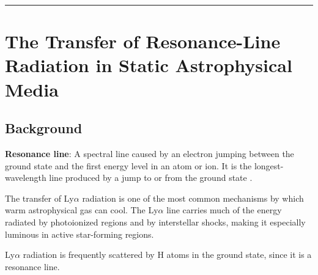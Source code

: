 \documentclass[onecolumn]{aastex63}
\begin{document}




\vspace{1cm}
\hrule
\vspace{1cm}

\section{The Transfer of Resonance-Line Radiation in Static Astrophysical Media}
\begin{centering}

\cite{neufeld1990}

\end{centering}


\subsection{Background}
\textbf{Resonance line}: A spectral line caused by an electron jumping between the ground state and the first energy level in an atom or ion. It is the longest-wavelength line produced by a jump to or from the ground state \citep{ADictionaryofAstronomy}.

The transfer of Ly$\alpha$ radiation is one of the most common mechanisms by which warm astrophysical gas can cool. The Ly$\alpha$ line carries much of the energy radiated by photoionized regions and by interstellar shocks, making it especially luminous in active star-forming regions.

Ly$\alpha$ radiation is frequently scattered by H atoms in the ground state, since it is a resonance line. 
\end{document}
